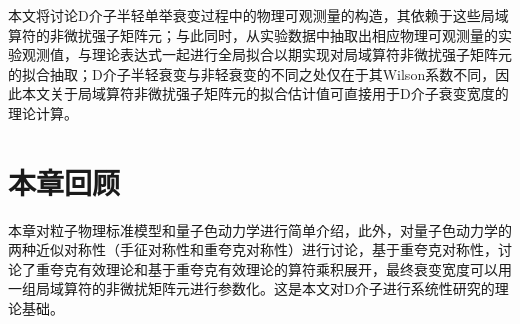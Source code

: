 本文将讨论D介子半轻单举衰变过程中的物理可观测量的构造，其依赖于这些局域算符的非微扰强子矩阵元；与此同时，从实验数据中抽取出相应物理可观测量的实验观测值，与理论表达式一起进行全局拟合以期实现对局域算符非微扰强子矩阵元的拟合抽取；D介子半轻衰变与非轻衰变的不同之处仅在于其Wilson系数不同，因此本文关于局域算符非微扰强子矩阵元的拟合估计值可直接用于D介子衰变宽度的理论计算。

\section{本章回顾}
本章对粒子物理标准模型和量子色动力学进行简单介绍，此外，对量子色动力学的两种近似对称性（手征对称性和重夸克对称性）进行讨论，基于重夸克对称性，讨论了重夸克有效理论和基于重夸克有效理论的算符乘积展开，最终衰变宽度可以用一组局域算符的非微扰矩阵元进行参数化。这是本文对D介子进行系统性研究的理论基础。
